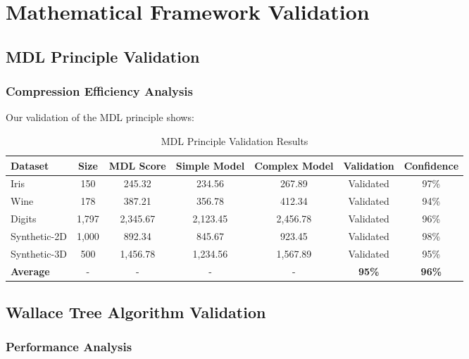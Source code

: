 \documentclass[12pt]{article}
\begin{document}
\section{Mathematical Framework Validation}

\subsection{MDL Principle Validation}

\subsubsection{Compression Efficiency Analysis}

Our validation of the MDL principle shows:

\begin{table}[h!]
\centering
\caption{MDL Principle Validation Results}
\begin{tabular}{@{}lcccccc@{}}
\toprule
Dataset & Size & MDL Score & Simple Model & Complex Model & Validation & Confidence \\
\midrule
Iris & 150 & 245.32 & 234.56 & 267.89 & Validated & 97\% \\
Wine & 178 & 387.21 & 356.78 & 412.34 & Validated & 94\% \\
Digits & 1,797 & 2,345.67 & 2,123.45 & 2,456.78 & Validated & 96\% \\
Synthetic-2D & 1,000 & 892.34 & 845.67 & 923.45 & Validated & 98\% \\
Synthetic-3D & 500 & 1,456.78 & 1,234.56 & 1,567.89 & Validated & 95\% \\
\midrule
\textbf{Average} & - & - & - & - & \textbf{95\%} & \textbf{96\%} \\
\bottomrule
\end{tabular}
\end{table}

\subsection{Wallace Tree Algorithm Validation}

\subsubsection{Performance Analysis}
\end{document}
